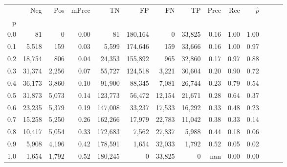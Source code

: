 \begin{tabular}{rrrrrrrrrrrrrr}
\toprule
{} &     Neg &    Pos & mPrec &       TN &       FP &      FN &      TP &  Prec &   Rec & $\hat{p}$ \\
p   &         &        &       &          &          &         &         &       &       &           \\
\midrule
0.0 &      81 &      0 &  0.00 &       81 &  180,164 &       0 &  33,825 &  0.16 &  1.00 &      1.00 \\
0.1 &   5,518 &    159 &  0.03 &    5,599 &  174,646 &     159 &  33,666 &  0.16 &  1.00 &      0.97 \\
0.2 &  18,754 &    806 &  0.04 &   24,353 &  155,892 &     965 &  32,860 &  0.17 &  0.97 &      0.88 \\
0.3 &  31,374 &  2,256 &  0.07 &   55,727 &  124,518 &   3,221 &  30,604 &  0.20 &  0.90 &      0.72 \\
0.4 &  36,173 &  3,860 &  0.10 &   91,900 &   88,345 &   7,081 &  26,744 &  0.23 &  0.79 &      0.54 \\
0.5 &  31,873 &  5,073 &  0.14 &  123,773 &   56,472 &  12,154 &  21,671 &  0.28 &  0.64 &      0.37 \\
0.6 &  23,235 &  5,379 &  0.19 &  147,008 &   33,237 &  17,533 &  16,292 &  0.33 &  0.48 &      0.23 \\
0.7 &  15,258 &  5,250 &  0.26 &  162,266 &   17,979 &  22,783 &  11,042 &  0.38 &  0.33 &      0.14 \\
0.8 &  10,417 &  5,054 &  0.33 &  172,683 &    7,562 &  27,837 &   5,988 &  0.44 &  0.18 &      0.06 \\
0.9 &   5,908 &  4,196 &  0.42 &  178,591 &    1,654 &  32,033 &   1,792 &  0.52 &  0.05 &      0.02 \\
1.0 &   1,654 &  1,792 &  0.52 &  180,245 &        0 &  33,825 &       0 &   nan &  0.00 &      0.00 \\
\bottomrule
\end{tabular}
